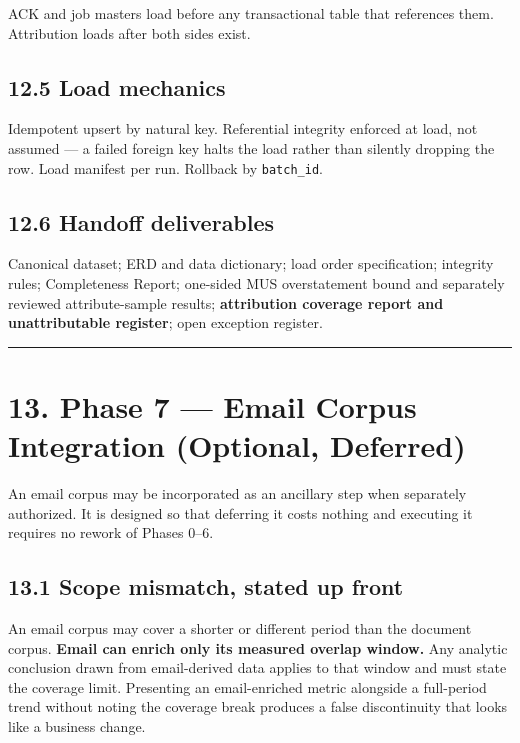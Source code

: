 \documentclass[
]{article}
\begin{document}
ACK and job masters load before any transactional table that references
them. Attribution loads after both sides exist.

\subsection{12.5 Load mechanics}\label{load-mechanics}

Idempotent upsert by natural key. Referential integrity enforced at
load, not assumed --- a failed foreign key halts the load rather than
silently dropping the row. Load manifest per run. Rollback by
\texttt{batch\_\allowbreak{}id}.

\subsection{12.6 Handoff deliverables}\label{handoff-deliverables}

Canonical dataset; ERD and data dictionary; load order specification;
integrity rules; Completeness Report; one-sided MUS overstatement bound
and separately reviewed attribute-sample results; \textbf{attribution
coverage report and unattributable register}; open exception register.

\begin{center}\rule{0.5\linewidth}{0.5pt}\end{center}

\section{13. Phase 7 --- Email Corpus Integration (Optional,
Deferred)}\label{phase-7-email-corpus-integration-optional-deferred}

An email corpus may be incorporated as an ancillary step when separately
authorized. It is designed so that deferring it costs nothing and
executing it requires no rework of Phases 0--6.

\subsection{13.1 Scope mismatch, stated up
front}\label{scope-mismatch-stated-up-front}

An email corpus may cover a shorter or different period than the
document corpus. \textbf{Email can enrich only its measured overlap
window.} Any analytic conclusion drawn from email-derived data applies
to that window and must state the coverage limit. Presenting an
email-enriched metric alongside a full-period trend without noting the
coverage break produces a false discontinuity that looks like a business
change.
\end{document}
